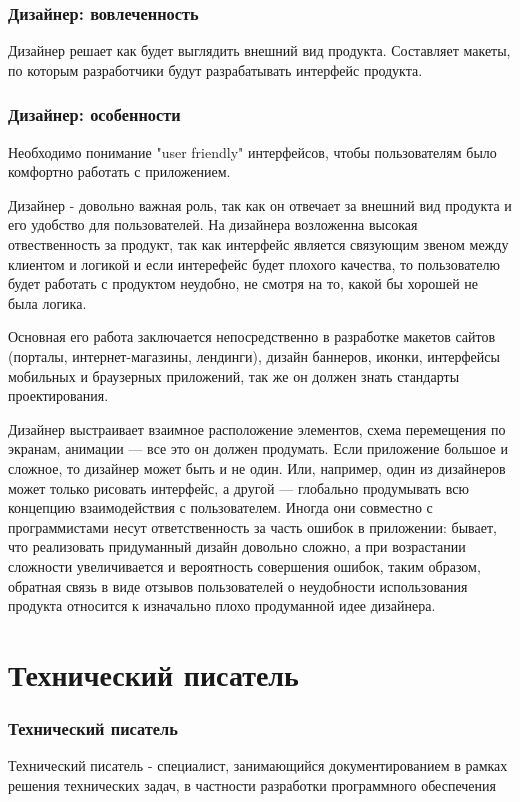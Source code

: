 \documentclass{../industrial-development}
\begin{document}
	\begin{frame} \frametitle{Дизайнер: вовлеченность}
		Дизайнер решает как будет выглядить внешний вид продукта. Составляет макеты, по которым разработчики будут разрабатывать интерфейс продукта.
	\end{frame}
	
	\begin{frame} \frametitle{Дизайнер: особенности}
		Необходимо понимание "user friendly" интерфейсов, чтобы пользователям было комфортно работать с приложением.
	\end{frame}

	\lecturenotes
		Дизайнер - довольно важная роль, так как он отвечает за внешний вид продукта и его удобство для пользователей. На дизайнера возложенна высокая отвественность за продукт, так как интерфейс является связующим звеном между клиентом и логикой и если интерефейс будет плохого качества, то пользователю будет работать с продуктом неудобно, не смотря на то, какой бы хорошей не была логика. 
		
		Основная его работа заключается непосредственно в разработке макетов сайтов (порталы, интернет-магазины, лендинги), дизайн баннеров, иконки, интерфейсы мобильных и браузерных приложений, так же он должен знать стандарты проектирования. 
		
		Дизайнер выстраивает взаимное расположение элементов, схема перемещения по экранам, анимации — все это он должен продумать. Если приложение большое и сложное, то дизайнер может быть и не один. Или, например, один из дизайнеров может только рисовать интерфейс, а другой — глобально продумывать всю концепцию взаимодействия с пользователем. Иногда они совместно с программистами несут ответственность за часть ошибок в приложении: бывает, что реализовать придуманный дизайн довольно сложно, а при возрастании сложности увеличивается и вероятность совершения ошибок, таким образом, обратная связь в виде отзывов пользователей о неудобности использования продукта относится к изначально плохо продуманной идее дизайнера. 
	
	\section{Технический писатель }
	
	\begin{frame} \frametitle{Технический писатель}
		\begin{block}{}
			\alert {Технический писатель} - специалист, занимающийся документированием в рамках решения технических задач, в частности разработки программного обеспечения
		\end{block}
	\end{frame}
	
\end{document}
